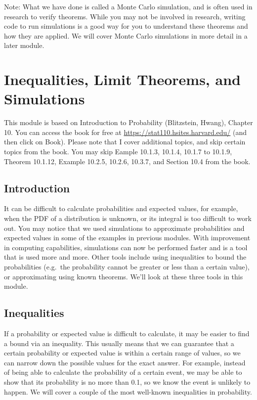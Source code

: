 \documentclass[
]{book}
\begin{document}
Note: What we have done is called a Monte Carlo simulation, and is often used in research to verify theorems. While you may not be involved in research, writing code to run simulations is a good way for you to understand these theorems and how they are applied. We will cover Monte Carlo simulations in more detail in a later module.

\chapter{Inequalities, Limit Theorems, and Simulations}\label{inequalities-limit-theorems-and-simulations}

This module is based on Introduction to Probability (Blitzstein, Hwang), Chapter 10. You can access the book for free at \url{https://stat110.hsites.harvard.edu/} (and then click on Book). Please note that I cover additional topics, and skip certain topics from the book. You may skip Eample 10.1.3, 10.1.4, 10.1.7 to 10.1.9, Theorem 10.1.12, Example 10.2.5, 10.2.6, 10.3.7, and Section 10.4 from the book.

\section{Introduction}\label{introduction-2}

It can be difficult to calculate probabilities and expected values, for example, when the PDF of a distribution is unknown, or its integral is too difficult to work out. You may notice that we used simulations to approximate probabilities and expected values in some of the examples in previous modules. With improvement in computing capabilities, simulations can now be performed faster and is a tool that is used more and more. Other tools include using inequalities to bound the probabilities (e.g.~the probability cannot be greater or less than a certain value), or approximating using known theorems. We'll look at these three tools in this module.

\section{Inequalities}\label{inequalities}

If a probability or expected value is difficult to calculate, it may be easier to find a bound via an inequality. This usually means that we can guarantee that a certain probability or expected value is within a certain range of values, so we can narrow down the possible values for the exact answer. For example, instead of being able to calculate the probability of a certain event, we may be able to show that its probability is no more than 0.1, so we know the event is unlikely to happen. We will cover a couple of the most well-known inequalities in probability.
\end{document}
